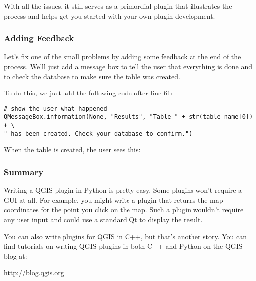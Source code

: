 With all the issues, it still serves as a primordial plugin that illustrates the process and helps get you started with your own plugin development.

\subsubsection{Adding Feedback}

Let's fix one of the small problems by adding some feedback at the end of the process.
We'll just add a message box to tell the user that everything is done and to check the database to make sure the table was created.

To do this, we just add the following code after line 61:

\begin{verbatim}
# show the user what happened
QMessageBox.information(None, "Results", "Table " + str(table_name[0]) + \
" has been created. Check your database to confirm.")
\end{verbatim}

When the table is created, the user sees this:


\subsubsection{Summary}
Writing a QGIS plugin in Python is pretty easy.
Some plugins won't require a GUI at all.
For example, you might write a plugin that returns the map coordinates for the point you click on the map.
Such a plugin wouldn't require any user input and could use a standard Qt \classname{QMessageBox} to display the result.

You can also write plugins for QGIS in C++, but that's another story.
You can find tutorials on writing QGIS plugins in both C++ and Python on the QGIS blog at:

\begin{center}
  \url{http://blog.qgis.org} 
\end{center}
